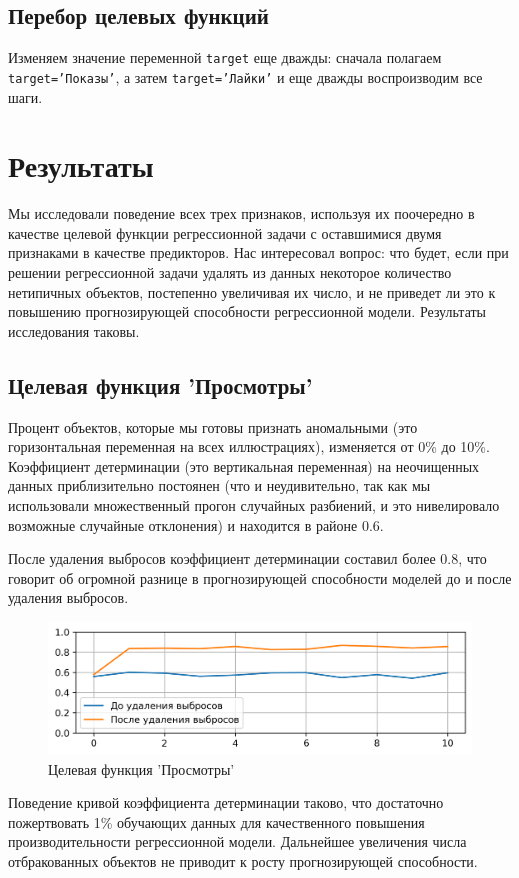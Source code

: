 \documentclass[a4paper,12pt]{article}
\begin{document}
\subsection{Перебор целевых функций}
Изменяем значение переменной \texttt{target} еще дважды: сначала полагаем \texttt{target='Показы'}, а затем \texttt{target='Лайки'} и еще дважды воспроизводим все шаги.


\section{Результаты}

Мы исследовали поведение всех трех признаков, используя их поочередно в качестве целевой функции регрессионной задачи с оставшимися двумя признаками в качестве предикторов. Нас интересовал вопрос: что будет, если при решении регрессионной задачи удалять из данных некоторое количество нетипичных объектов, постепенно увеличивая их число, и не приведет ли это к повышению прогнозирующей способности регрессионной модели. Результаты исследования таковы.

\subsection{Целевая функция 'Просмотры'}

Процент объектов, которые мы готовы признать аномальными (это горизонтальная переменная на всех иллюстрациях), изменяется от 0\% до 10\%. Коэффициент детерминации (это вертикальная переменная) на неочищенных данных приблизительно постоянен (что и неудивительно, так как мы использовали множественный прогон случайных разбиений, и это нивелировало возможные случайные отклонения) и находится в районе 0.6. 

После удаления выбросов коэффициент детерминации составил более 0.8, что говорит об огромной разнице в прогнозирующей способности моделей до и после удаления выбросов.

\begin{figure}[!h]
	\centering
	\includegraphics[width=0.8\linewidth]{pictures/Просмотры}
	\caption{Целевая функция 'Просмотры'}
\end{figure}
Поведение кривой коэффициента детерминации таково, что достаточно пожертвовать 1\% обучающих данных для качественного повышения производительности регрессионной модели. Дальнейшее увеличения числа отбракованных объектов не приводит к росту прогнозирующей способности.
\end{document}
